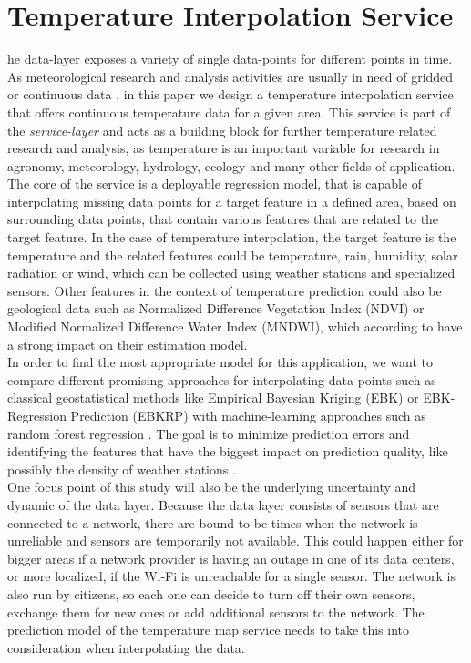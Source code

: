 \chapter{Temperature Interpolation Service}

he data-layer exposes a variety of single data-points for different points in time. As meteorological research and analysis activities are usually in need of gridded or continuous data \cite{sekulic2020spatio}, in this paper we design a temperature interpolation service that offers continuous temperature data for a given area. This service is part of the \textit{service-layer} and acts as a building block for further temperature related research and analysis, as temperature is an important variable for research in agronomy, meteorology, hydrology, ecology and many other fields of application.\\
The core of the service is a deployable regression model, that is capable of interpolating missing data points for a target feature in a defined area, based on surrounding data points, that contain various features that are related to the target feature. In the case of temperature interpolation, the target feature is the temperature and the related features could be temperature, rain, humidity, solar radiation or wind, which can be collected using weather stations and specialized sensors. Other features in the context of temperature prediction could also be geological data such as  Normalized Difference Vegetation Index (NDVI) or Modified Normalized Difference Water Index (MNDWI), which according to \cite{alonso2020new} have a strong impact on their estimation model.\\
In order to find the most appropriate model for this application, we want to compare different promising approaches for interpolating data points such as classical geostatistical methods like Empirical Bayesian Kriging (EBK) or EBK-Regression Prediction (EBKRP) \cite{njoku2023effects} with machine-learning approaches such as random forest regression \cite{alonso2020new}. The goal is to minimize prediction errors and identifying the features that have the biggest impact on prediction quality, like possibly the density of weather stations \cite{njoku2023effects}.\\
One focus point of this study will also be the underlying uncertainty and dynamic of the data layer. Because the data layer consists of sensors that are connected to a network, there are bound to be times when the network is unreliable and sensors are temporarily not available. This could happen either for bigger areas if a network provider is having an outage in one of its data centers, or more localized, if the Wi-Fi is unreachable for a single sensor. The network is also run by citizens, so each one can decide to turn off their own sensors, exchange them for new ones or add additional sensors to the network. The prediction model of the temperature map service needs to take this into consideration when interpolating the data.

